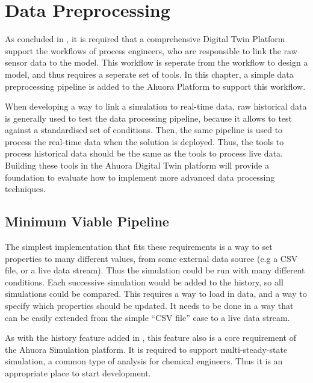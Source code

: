 \chapter{Data Preprocessing} \label{sec:datapreprocessing}



As concluded in , it is required that a comprehensive Digital Twin Platform support the workflows of process engineers, who are responsible to link the raw sensor data to the model. This workflow is seperate from the workflow to design a model, and thus requires a seperate set of tools. 
In this chapter, a simple data preprocessing pipeline is added to the Ahuora Platform to support this workflow. 

When developing a way to link a simulation to real-time data, raw historical data is generally used to test the data processing pipeline, because it allows to test against a standardised set of conditions. Then, the same pipeline is used to process the real-time data when the solution is deployed.
Thus, the tools to process historical data should be the same as the tools to process live data. Building these tools in the Ahuora Digital Twin platform will provide a foundation to evaluate how to implement more advanced data processing techniques.

\section{Minimum Viable Pipeline}

The simplest implementation that fits these requirements is a way to set properties to many different values, from some external data source (e.g a CSV file, or a live data stream). Thus the simulation could be run with many different conditions. Each successive simulation would be added to the history, so all simulations could be compared.
This requires a way to load in data, and a way to specify which properties should be updated. It needs to be done in a way that can be easily extended from the simple ``CSV file'' case to a live data stream.

As with the history feature added in , this feature also is a core requirement of the Ahuora Simulation platform. It is required to support multi-steady-state simulation, a common type of analysis for chemical engineers. Thus it is an appropriate place to start development. 


